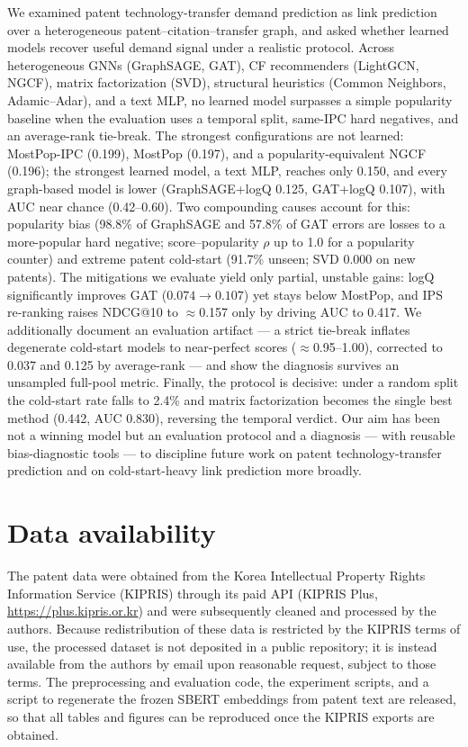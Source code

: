 \documentclass[preprint,12pt]{elsarticle}
\begin{document}
We examined patent technology-transfer demand prediction as link prediction over a
heterogeneous patent--citation--transfer graph, and asked whether learned models
recover useful demand signal under a realistic protocol. Across heterogeneous GNNs
(GraphSAGE, GAT), CF recommenders (LightGCN, NGCF), matrix factorization (SVD),
structural heuristics (Common Neighbors, Adamic--Adar), and a text MLP, no learned
model surpasses a simple popularity baseline when the evaluation uses a temporal split,
same-IPC hard negatives, and an average-rank tie-break. The strongest configurations
are not learned: MostPop-IPC (0.199), MostPop (0.197), and a popularity-equivalent NGCF
(0.196); the strongest learned model, a text MLP, reaches only 0.150, and every
graph-based model is lower (GraphSAGE+logQ 0.125, GAT+logQ 0.107), with AUC near chance
(0.42--0.60). Two compounding causes account for this: popularity bias (98.8\% of
GraphSAGE and 57.8\% of GAT errors are losses to a more-popular hard negative;
score--popularity $\rho$ up to 1.0 for a popularity counter) and extreme patent
cold-start (91.7\% unseen; SVD 0.000 on new patents). The
mitigations we evaluate yield only partial, unstable gains: logQ significantly improves
GAT ($0.074\!\to\!0.107$) yet stays below MostPop, and IPS re-ranking raises NDCG@10 to
$\approx$0.157 only by driving AUC to 0.417. We additionally document an evaluation
artifact --- a strict tie-break inflates degenerate cold-start models to near-perfect
scores ($\approx$0.95--1.00), corrected to 0.037 and 0.125 by average-rank --- and show
the diagnosis survives an unsampled full-pool metric. Finally, the protocol is
decisive: under a random split the cold-start rate falls to 2.4\% and matrix
factorization becomes the single best method (0.442, AUC 0.830), reversing
the temporal verdict. Our aim has been not a winning model but an evaluation protocol
and a diagnosis --- with reusable bias-diagnostic tools --- to discipline future work on
patent technology-transfer prediction and on cold-start-heavy link prediction more
broadly.

\section*{Data availability}
The patent data were obtained from the Korea Intellectual Property Rights Information
Service (KIPRIS) through its paid API (KIPRIS Plus, \url{https://plus.kipris.or.kr})
and were subsequently cleaned and processed by the authors. Because redistribution of
these data is restricted by the KIPRIS terms of use, the processed dataset is not
deposited in a public repository; it is instead available from the authors by email
upon reasonable request, subject to those terms. The preprocessing and
evaluation code, the experiment scripts, and a script to regenerate the frozen SBERT
embeddings from patent text are released, so that all tables and figures can be
reproduced once the KIPRIS exports are obtained.
\end{document}

